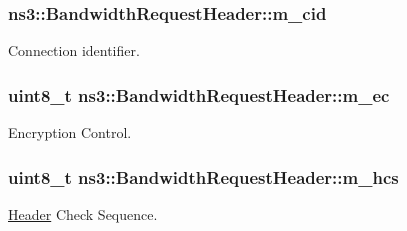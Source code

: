 \subsubsection[{\texorpdfstring{m\+\_\+cid}{m_cid}}]{ ns3\+::\+Bandwidth\+Request\+Header\+::m\+\_\+cid\hspace{0.3cm}{\ttfamily [private]}}\hypertarget{classns3_1_1BandwidthRequestHeader_aea0cd9244c65e015ca03d4139d8cef62}{}\label{classns3_1_1BandwidthRequestHeader_aea0cd9244c65e015ca03d4139d8cef62}


Connection identifier. 

\subsubsection[{\texorpdfstring{m\+\_\+ec}{m_ec}}]{\setlength{\rightskip}{0pt plus 5cm}uint8\+\_\+t ns3\+::\+Bandwidth\+Request\+Header\+::m\+\_\+ec\hspace{0.3cm}{\ttfamily [private]}}\hypertarget{classns3_1_1BandwidthRequestHeader_a015f61b40a1d73ed35d84a9cbe182e86}{}\label{classns3_1_1BandwidthRequestHeader_a015f61b40a1d73ed35d84a9cbe182e86}


Encryption Control. 

\subsubsection[{\texorpdfstring{m\+\_\+hcs}{m_hcs}}]{\setlength{\rightskip}{0pt plus 5cm}uint8\+\_\+t ns3\+::\+Bandwidth\+Request\+Header\+::m\+\_\+hcs\hspace{0.3cm}{\ttfamily [private]}}\hypertarget{classns3_1_1BandwidthRequestHeader_a5d7b69f1290ad7762292a556d7f1687d}{}\label{classns3_1_1BandwidthRequestHeader_a5d7b69f1290ad7762292a556d7f1687d}


\hyperlink{classns3_1_1Header}{Header} Check Sequence. 

